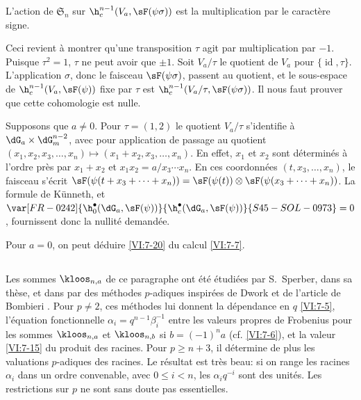 \begin{proposition_}\label{VI:7-20}
L'action de $\mathfrak{S}_n$ sur $\h_c^{n-1}(V_a,\sF(\psi\sigma))$ est la multiplication 
par le caractère signe. 
\end{proposition_}

Ceci revient à montrer qu'une transposition $\tau$ agit par multiplication 
par $-1$. Puisque $\tau^2=1$, $\tau$ ne peut avoir  que 
$\pm 1$. Soit $V_a/\tau$ le quotient de $V_a$ pour 
$\{\operatorname{id},\tau\}$. L'application $\sigma$, donc le faisceau 
$\sF(\psi\sigma)$, passent au quotient, et le sous-espace de 
$\h_c^{n-1}(V_a,\sF(\psi))$ fixe par 
$\tau$ est $\h_c^{n-1}(V_a/\tau,\sF(\psi\sigma))$. Il nous faut prouver que 
cette cohomologie est nulle. 

Supposons que $a\ne 0$. Pour $\tau=(1,2)$ le quotient $V_a/\tau$ s'identifie 
à $\dG_a\times \dG_m^{n-2}$, avec pour application de passage au quotient 
$(x_1,x_2,x_3,\dots,x_n)\mapsto (x_1+x_2,x_3,\dots,x_n)$. En effet, $x_1$ et 
$x_2$ sont déterminés 
à l'ordre près par $x_1+x_2$ et 
$x_1x_2 = a/x_3\dotsm x_n$. En ces coordonnées $(t,x_3,\dots,x_n)$, le 
faisceau s'écrit 
$\sF(\psi(t+x_3+\cdots + x_n)) = \sF(\psi(t))\otimes \sF(\psi(x_3+\cdots + x_n))$. 
La formule de K\"unneth, et $\var[FR-0242]{\h_0^\bullet(\dG_a,\sF(\psi))}{\h_c^\bullet(\dG_a,\sF(\psi))}{S45-SOL-0973} = 0$, fournissent 
donc la nullité demandée. 

Pour $a=0$, on peut déduire \ref{VI:7-20} du calcul \ref{VI:7-7}. 





\subsection{}\label{VI:7-21}

Les sommes $\kloos_{n,a}$ de ce paragraphe ont été étudiées par 
S.\ Sperber, dans sa thèse, et dans  par des méthodes 
$p$-adiques inspirées de Dwork et de l'article de Bombieri . 
Pour $p\ne 2$, ces méthodes lui donnent la dépendance en $q$ \ref{VI:7-5}, 
l'équation fonctionnelle $\alpha_i = q^{n-1} \beta_i^{-1}$ entre les 
valeurs propres de Frobenius pour les sommes $\kloos_{n,a}$ et 
$\kloos_{n,b}$ si $b=(-1)^n a$ (cf. \ref{VI:7-6}), et la valeur \ref{VI:7-15} 
du produit des racines. Pour $p\geqslant n+3$, il détermine de plus les 
valuations $p$-adiques des racines. Le résultat est très beau: si on range 
les racines $\alpha_i$ dans un ordre convenable, avec 
$0\leqslant i<n$, les $\alpha_i q^{-i}$ sont des unités. Les 
restrictions sur $p$ ne sont sans doute pas essentielles. 











